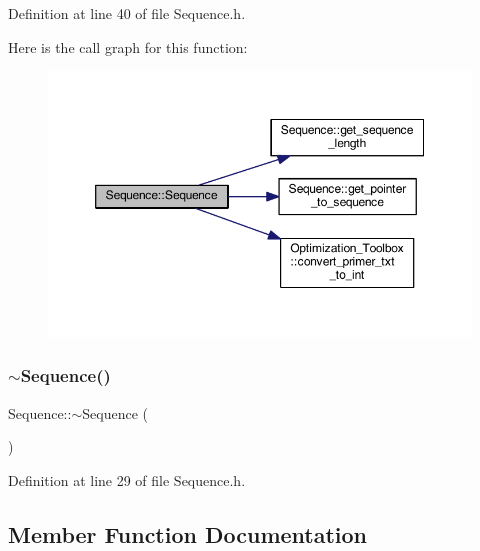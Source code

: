 Definition at line 40 of file Sequence.\+h.

Here is the call graph for this function\+:
\nopagebreak
\begin{figure}[H]
\begin{center}
\leavevmode
\includegraphics[width=350pt]{class_sequence_ad6f16ee0cacbb22596c7a34d8a2f4c14_cgraph}
\end{center}
\end{figure}
\mbox{\label{class_sequence_aee09a7d70c3ab523fed85da94ea1366f}} 
\subsubsection{\texorpdfstring{$\sim$\+Sequence()}{~Sequence()}}
{\footnotesize\ttfamily Sequence\+::$\sim$\+Sequence (\begin{DoxyParamCaption}{ }\end{DoxyParamCaption})}



Definition at line 29 of file Sequence.\+h.



\subsection{Member Function Documentation}
\mbox{\label{class_sequence_a9c1e7770390e4f1d02ae250d640a32a7}} 
